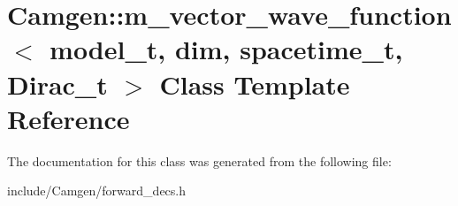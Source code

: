 \hypertarget{a00333}{\section{Camgen\-:\-:m\-\_\-vector\-\_\-wave\-\_\-function$<$ model\-\_\-t, dim, spacetime\-\_\-t, Dirac\-\_\-t $>$ Class Template Reference}
\label{a00333}
}


The documentation for this class was generated from the following file\-:\begin{DoxyCompactItemize}
\item 
include/\-Camgen/forward\-\_\-decs.\-h\end{DoxyCompactItemize}
